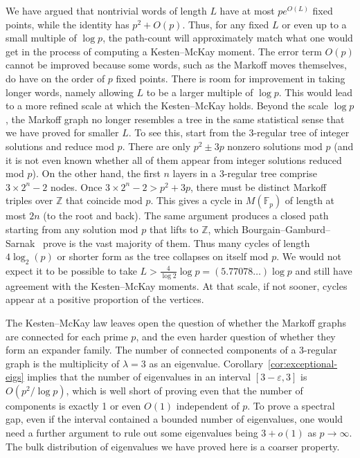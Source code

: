 \documentclass[10pt]{amsart}
\theoremstyle{definition}\newtheorem{defi}[theo]{Definition}\newtheorem{rema}[theo]{Remark}\newtheorem{exam}[theo]{Example}\newtheorem{exem}[theo]{Example}\newtheorem{nota}[theo]{Notation}
\newcommand{\Z}{\mathbb{Z}}
\newcommand{\F}{\mathbb{F}}
\begin{document}
We have argued that nontrivial words of length $L$ have at most $p e^{O(L)}$ fixed points, while the identity has $p^2 + O(p)$. Thus, for any fixed $L$ or even up to a small multiple of $\log{p}$, the path-count will approximately match what one would get in the process of computing a Kesten--McKay moment. The error term $O(p)$ cannot be improved because some words, such as the Markoff moves themselves, do have on the order of $p$ fixed points. There is room for improvement in taking longer words, namely allowing $L$ to be a larger multiple of $\log{p}$. This would lead to a more refined scale at which the Kesten--McKay holds. Beyond the scale $\log{p}$, the Markoff graph no longer resembles a tree in the same statistical sense that we have proved for smaller $L$. To see this, start from the 3-regular tree of integer solutions and reduce mod $p$. There are only $p^2 \pm 3p$ nonzero solutions mod $p$ (and it is not even known whether all of them appear from integer solutions reduced mod $p$). On the other hand, the first $n$ layers in a 3-regular tree comprise $3 \times 2^n - 2$ nodes. Once $3 \times 2^n - 2 > p^2+3p$, there must be distinct Markoff triples over $\Z$ that coincide mod $p$. This gives a cycle in $M(\F_p)$ of length at most $2n$ (to the root and back). The same argument produces a closed path starting from any solution mod $p$ that lifts to $\Z$, which Bourgain--Gamburd--Sarnak~\cite{BGS} prove is the vast majority of them. Thus many cycles of length $4\log_2(p)$ or shorter form as the tree collapses on itself mod $p$. We would not expect it to be possible to take $L > \frac{4}{\log{2}} \log{p} = (5.77078\ldots) \log{p}$ and still have agreement with the Kesten--McKay moments. At that scale, if not sooner, cycles appear at a positive proportion of the vertices.

The Kesten--McKay law leaves open the question of whether the Markoff graphs are connected for each prime $p$, and the even harder question of whether they form an expander family. The number of connected components of a 3-regular graph is the multiplicity of $\lambda=3$ as an eigenvalue. Corollary~\ref{cor:exceptional-eigs} implies that the number of eigenvalues in an interval $[3-\varepsilon,3]$ is $O(p^2/\log{p})$, which is well short of proving even that the number of components is exactly 1 or even $O(1)$ independent of $p$. To prove a spectral gap, even if the interval contained a bounded number of eigenvalues, one would need a further argument to rule out some eigenvalues being $3+o(1)$ as $p \rightarrow \infty$. The bulk distribution of eigenvalues we have proved here is a coarser property.
\end{document}
